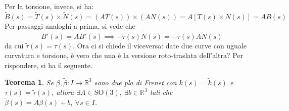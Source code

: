 \documentclass[12pt]{article}
\theoremstyle{style}
\newtheorem{teorema}{Teorema}[section]
\numberwithin{equation}{subsection}
\begin{document}
Per la torsione, invece, si ha:
\[
\widetilde{B}(s) = \widetilde{T}(s) \times \widetilde{N}(s) = (AT(s)) \times (AN(s)) = A\left[ T(s) \times N(s) \right] = A B(s)
\] 
Per passaggi analoghi a prima, si vede che 
\[
\widetilde{B}'(s) = A B'(s) \implies -\widetilde{\tau }(s) \widetilde{N}(s) = - \tau (s) A N(s)
\] 
da cui $\widetilde{\tau }(s) = \tau (s)$.
Ora ci si chiede il viceversa: date due curve con uguale curvatura e torsione, \`e vero che una \`e la versione roto-traslata dell'altra?
Per rispondere, si ha il seguente.
\begin{teorema}
	Se $\beta ,\widetilde{\beta }:I\to\mathbb{R}^3$ sono due pla di Frenet con $k(s) = \widetilde{k}(s)$ e $\tau (s)= \widetilde{\tau }(s)$, allora $\exists A \in \mathrm{SO} (3), \ \exists b \in \mathbb{R}^3$ tali che $\widetilde{\beta }(s) = A \beta (s) + b , \ \forall s \in I$.
\end{teorema}
\end{document}
